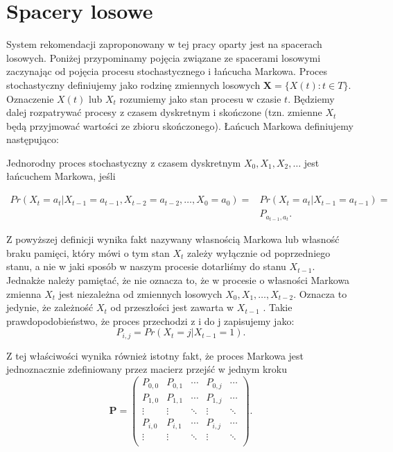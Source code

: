 \section{Spacery losowe}
\label{chap:spacerylosowe}

System rekomendacji zaproponowany w tej pracy oparty jest na spacerach losowych. Poniżej przypominamy pojęcia związane ze spacerami losowymi zaczynając od pojęcia procesu stochastycznego i łańcucha Markowa. Proces stochastyczny definiujemy jako rodzinę zmiennych losowych $\mathbf{X}=\{X(t): t \in T\}$. Oznaczenie $X(t)$ lub $X_t$ rozumiemy jako stan procesu w czasie $t$. 
Będziemy dalej rozpatrywać procesy z czasem dyskretnym i skończone (tzn. zmienne $X_t$ będą przyjmować wartości ze zbioru skończonego). Łańcuch Markowa definiujemy następująco:

\begin{definition}\label{def:markow}
Jednorodny proces stochastyczny z czasem dyskretnym $X_{0}, X_{1}, X_{2},\dots$ jest łańcuchem Markowa, jeśli \cite{Metodyksiazka}

\begin{equation}
\begin{aligned}
    Pr(X_{t}= a_{t} | X_{t-1} = a_{t-1}, X_{t-2} = a_{t-2},\dots, X_{0} = a_{0}) = & Pr(X_{t} = a_{t} | X_{t-1} = a_{t-1}) = \\ & P_{a_{t-1},a_{t}} .
\end{aligned}
\end{equation}
\end{definition}

Z powyższej definicji wynika fakt nazywany własnością Markowa lub własność braku pamięci, który mówi o tym stan $X_{t}$ zależy wyłącznie od poprzedniego stanu, a nie w jaki sposób w naszym procesie dotarliśmy do stanu $X_{t-1}$. Jednakże należy pamiętać, że nie oznacza to, że w procesie o własności Markowa zmienna $X_{t}$ jest niezależna od zmiennych losowych $X_{0},X_{1},\dots,X_{t-2}$.
Oznacza to jedynie, że zależność $X_t$ od przeszłości jest zawarta w $X_{t-1}$ \cite{Metodyksiazka}. Takie prawdopodobieństwo, że proces przechodzi z i do j zapisujemy jako:
\begin{equation*}
P_{i,j} = Pr(X_t = j | X_{t-1} = 1).
\end{equation*}

Z tej właściwości wynika również istotny fakt, że proces Markowa jest jednoznacznie zdefiniowany przez macierz przejść w jednym kroku
\begin{equation*}
\bm{P} =
\left(\begin{array}{ccccc}
P_{0,0} & P_{0,1}  & \cdots & P_{0,j} & \cdots \\
P_{1,0} & P_{1,1}  & \cdots & P_{1,j} & \cdots \\
\vdots & \vdots & \ddots & \vdots & \ddots \\
P_{i,0} & P_{i,1}  & \cdots & P_{i,j} & \cdots \\
\vdots & \vdots & \ddots & \vdots & \ddots \\
\end{array}\right) .
\label{eq:postac}
\end{equation*} 

